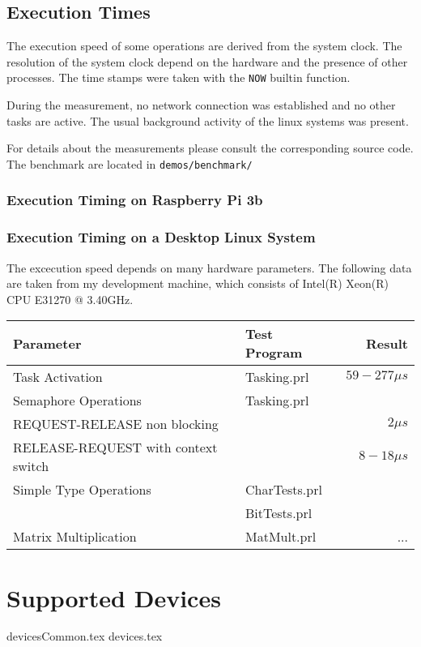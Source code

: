 \documentclass[10pt]{scrbook}
\begin{document}
\section{Execution Times}
The execution speed of some operations are derived from the system clock.
The resolution of the system clock depend on the hardware and the 
presence of other processes.
The time stamps were taken with the \texttt{NOW} builtin function.

During the measurement, no network connection was established and no
other tasks are active. The usual background activity of the linux
systems was present.

For details about the measurements please consult the corresponding
source code. The benchmark are located in \verb|demos/benchmark/|

\subsection{Execution Timing on Raspberry Pi 3b}

\subsection{Execution Timing on a Desktop Linux System}
The excecution speed depends on many hardware parameters. 
The following data are taken from my development machine, which consists of
Intel(R) Xeon(R) CPU E31270 @ 3.40GHz.


\begin{tabular}{|p{5cm}|l|r|}
\hline
Parameter & Test Program & Result \\
\hline
Task Activation & Tasking.prl & $59-277 \mu s$\\
\hline
Semaphore Operations & Tasking.prl &  \\
REQUEST-RELEASE non blocking & & $2 \mu s$\\
RELEASE-REQUEST with context switch & & $8-18\mu s$\\

\hline
Simple Type Operations & CharTests.prl & \\
                       & BitTests.prl & \\
\hline
Matrix Multiplication & MatMult.prl & ...\\
\hline
\end{tabular}



\chapter{Supported Devices}
{devicesCommon.tex}
{devices.tex}
\end{document}
